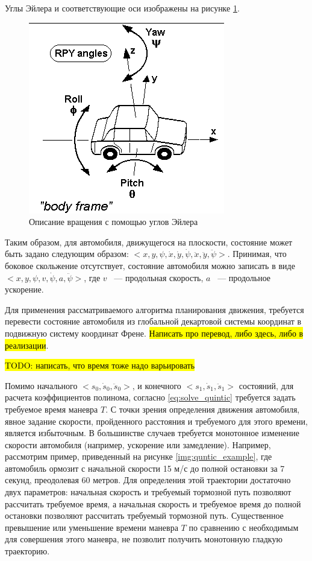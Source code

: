 Углы Эйлера и соответствующие оси изображены на рисунке \ref{img:euler_angles}.

\begin{figure}[h]
      \centering
      \includegraphics[width=0.5\linewidth]{images/euler_angles}
      \caption{Описание вращения с помощью углов Эйлера}
      \label{img:euler_angles}
\end{figure}

Таким образом, для автомобиля, движущегося на плоскости, состояние может быть задано следующим образом:
$<x, y, \psi, \dot{x}, \dot{y}, \dot{\psi}, \ddot{x}, \ddot{y}, \ddot{\psi}>$. Принимая, что боковое скольжение
отсутствует, состояние автомобиля можно записать в виде $<x, y, \psi, v, \dot{\psi}, a, \ddot{\psi}>$,
где $v$ ~--- продольная скорость, $a$ ~--- продольное ускорение.

Для применения рассматриваемого алгоритма планирования движения, требуется перевести состояние автомобиля из
глобальной декартовой системы координат в подвижную систему координат Френе. \hl{Написать про перевод, либо здесь,
либо в реализации}.

\hl{TODO: написать, что время тоже надо варьировать}

Помимо начального $<s_0, \dot{s}_0, \ddot{s}_0>$, и конечного $<s_1, \dot{s}_1, \ddot{s}_1>$ состояний, для расчета
коэффициентов полинома, согласно \ref{eq:solve_quintic} требуется задать требуемое время маневра $T$. С точки зрения
определения движения автомобиля, явное задание скорости, пройденного расстояния и требуемого для этого времени, является
избыточным. В большинстве случаев требуется монотонное изменение скорости автомобиля (например, ускорение или
замедление). Например, рассмотрим пример, приведенный на рисунке \ref{img:quntic_example}, где автомобиль
ормозит с начальной скорости 15 м/с до полной остановки за 7 секунд, преодолевая 60 метров. Для определения этой траектории
достаточно двух параметров: начальная скорость и требуемый тормозной путь позволяют рассчитать требуемое время, а
начальная скорость и требуемое время до полной остановки позволяют рассчитать требуемый тормозной путь. Существенное
превышение или уменьшение времени маневра $T$ по сравнению с необходимым для совершения этого маневра, не позволит
получить монотонную гладкую траекторию.

